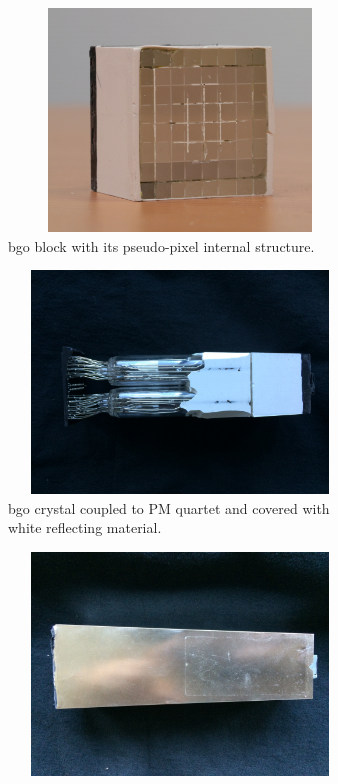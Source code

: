 \begin{figure}
\begin{subfigure}[t]{.5\textwidth}
\centering
\includegraphics[width=1\textwidth, height=16em]{03_GraphicFiles/chapter3_CLaRySproto/Absorber/images/block_noPM}
\caption{\gls{bgo} block with its pseudo-pixel internal structure.}
\label{chap3::fig::block_noPM}
\end{subfigure}
\begin{subfigure}[t]{.5\textwidth}
\centering
\includegraphics[width=1\textwidth, height=16em]{03_GraphicFiles/chapter3_CLaRySproto/Absorber/images/originalBlock_noAluminum}
\caption{\gls{bgo} crystal coupled to \gls{PM} quartet and covered with white reflecting material.}
\label{chap3::fig::originalBlock_noAl}
\end{subfigure}\newline
\begin{subfigure}[t]{.5\textwidth}
\centering
\includegraphics[width=1\textwidth, height=16em]{03_GraphicFiles/chapter3_CLaRySproto/Absorber/images/originalBlock_withAluminum}

\end{subfigure}
\end{figure}
